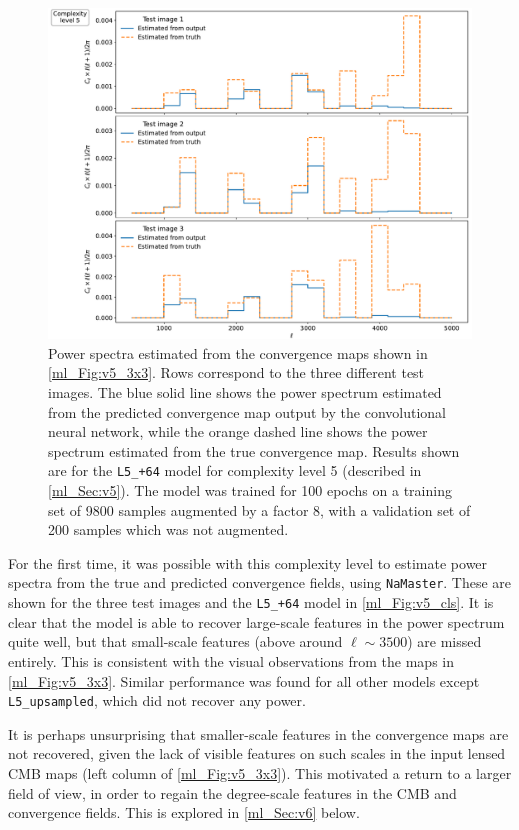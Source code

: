 \begin{figure}[tp]
\includegraphics[width=\textwidth]{v5_cls}
\caption{Power spectra estimated from the convergence maps shown in \autoref{ml_Fig:v5_3x3}. Rows correspond to the three different test images. The blue solid line shows the power spectrum estimated from the predicted convergence map output by the convolutional neural network, while the orange dashed line shows the power spectrum estimated from the true convergence map. Results shown are for the \texttt{L5\_+64} model for complexity level 5 (described in \autoref{ml_Sec:v5}). The model was trained for 100 epochs on a training set of 9800 samples augmented by a factor 8, with a validation set of 200 samples which was not augmented.}
\label{ml_Fig:v5_cls}
\end{figure}

For the first time, it was possible with this complexity level to estimate power spectra from the true and predicted convergence fields, using \texttt{NaMaster}. These are shown for the three test images and the \texttt{L5\_+64} model in \autoref{ml_Fig:v5_cls}. It is clear that the model is able to recover large-scale features in the power spectrum quite well, but that small-scale features (above around $\ell \sim 3500$) are missed entirely. This is consistent with the visual observations from the maps in \autoref{ml_Fig:v5_3x3}. Similar performance was found for all other models except \texttt{L5\_upsampled}, which did not recover any power.

It is perhaps unsurprising that smaller-scale features in the convergence maps are not recovered, given the lack of visible features on such scales in the input lensed CMB maps (left column of \autoref{ml_Fig:v5_3x3}). This motivated a return to a larger field of view, in order to regain the degree-scale features in the CMB and convergence fields. This is explored in \autoref{ml_Sec:v6} below.

